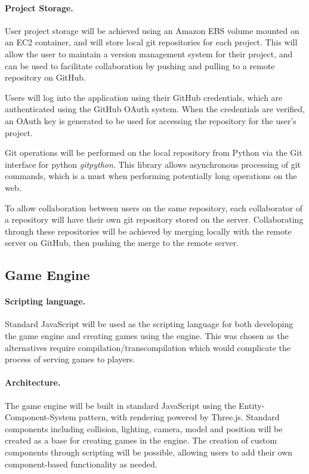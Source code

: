 \documentclass[a4paper, 12pt]{article}
\begin{document}
\paragraph{Project Storage.}
User project storage will be achieved using an Amazon EBS volume mounted on an EC2 container, and will store local git repositories for each project. This will allow the user to maintain a version management system for their project, and can be used to facilitate collaboration by pushing and pulling to a remote repository on GitHub.

Users will log into the application using their GitHub credentials, which are authenticated using the GitHub OAuth system. When the credentials are verified, an OAuth key is generated to be used for accessing the repository for the user's project.

Git operations will be performed on the local repository from Python via the Git interface for python \emph{gitpython}. This library allows asynchronous processing of git commands, which is a must when performing potentially long operations on the web.

To allow collaboration between users on the same repository, each collaborator of a repository will have their own git repository stored on the server. Collaborating through these repositories will be achieved by merging locally with the remote server on GitHub, then pushing the merge to the remote server.

\subsection{Game Engine}
\paragraph{Scripting language.}
Standard JavaScript will be used as the scripting language for both developing the game engine and creating games using the engine. This was chosen as the alternatives require compilation/transcompilation which would complicate the process of serving games to players.

\paragraph{Architecture.}
The game engine will be built in standard JavaScript using the Entity-Component-System pattern, with rendering powered by Three.js. Standard components including collision, lighting, camera, model and position will be created as a base for creating games in the engine. The creation of custom components through scripting will be possible, allowing users to add their own component-based functionality as needed.
\end{document}
